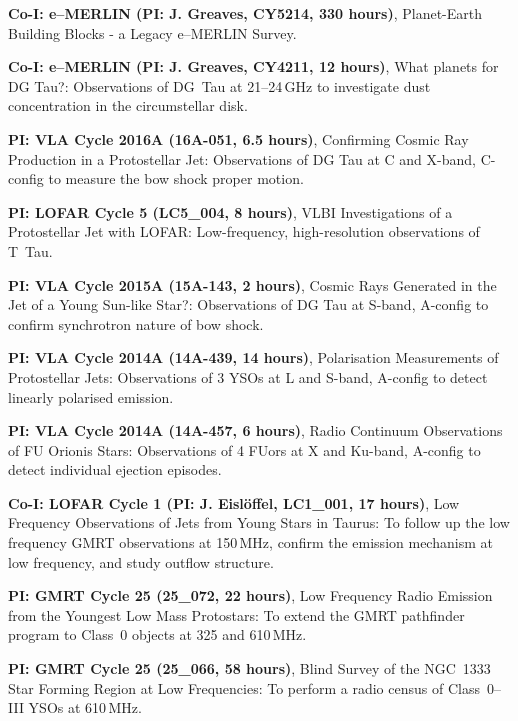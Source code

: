 
\begin{cvpubs}
  \cvpub
    {
      \begin{cvlist}
        \item {\textbf{Co-I: e--MERLIN (PI: J. Greaves, CY5214, 330 hours)}, Planet-Earth Building Blocks - a Legacy e--MERLIN Survey.}
  \item {\textbf{Co-I: e--MERLIN (PI: J. Greaves, CY4211, 12 hours)}, What planets for DG Tau?: Observations of DG~Tau at 21--24\,GHz to investigate dust concentration in the circumstellar disk.}
  \item {\textbf{PI: VLA Cycle 2016A (16A-051, 6.5 hours)}, Confirming Cosmic Ray Production in a Protostellar Jet: Observations of DG Tau at C and X-band, C-config to measure the bow shock proper motion.}
  \item {\textbf{PI: LOFAR Cycle 5 (LC5\_004, 8 hours)}, VLBI Investigations of a Protostellar Jet with LOFAR: Low-frequency, high-resolution observations of T~Tau.}
  \item {\textbf{PI: VLA Cycle 2015A (15A-143, 2 hours)}, Cosmic Rays Generated in the Jet of a Young Sun-like Star?: Observations of DG Tau at S-band, A-config to confirm synchrotron nature of bow shock.}
  \item {\textbf{PI: VLA Cycle 2014A (14A-439, 14 hours)}, Polarisation Measurements of Protostellar Jets: Observations of 3 YSOs at L and S-band, A-config to detect linearly polarised emission.}
  \item {\textbf{PI: VLA Cycle 2014A (14A-457, 6 hours)}, Radio Continuum Observations of FU Orionis Stars: Observations of 4 FUors at X and Ku-band, A-config to detect individual ejection episodes.}
  \item {\textbf{Co-I: LOFAR Cycle 1 (PI: J. Eisl{\"o}ffel, LC1\_001, 17 hours)}, Low Frequency Observations of Jets from Young Stars in Taurus: To follow up the low frequency GMRT observations at 150\,MHz, confirm the emission mechanism at low frequency, and study outflow structure.}
  \item {\textbf{PI: GMRT Cycle 25 (25\_072, 22 hours)}, Low Frequency Radio Emission from the Youngest Low Mass Protostars: To extend the GMRT pathfinder program to Class~0 objects at 325 and 610\,MHz.}
  \item {\textbf{PI: GMRT Cycle 25 (25\_066, 58 hours)}, Blind Survey of the NGC~1333 Star Forming Region at Low Frequencies: To perform a radio census of Class~0--III YSOs at 610\,MHz.}
      \end{cvlist}
    }
\vspace{-11pt}
\end{cvpubs}